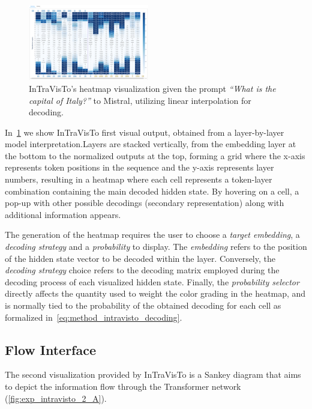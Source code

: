 \documentclass[11pt,a4paper,twocolumn]{article}
\begin{document}
\begin{figure}[h!]
    \centering
    \includegraphics[width=0.47\textwidth]{exp_intravisto_1A_heatmap.png}
    \caption{InTraVisTo's heatmap visualization given the prompt \emph{``What is the capital of Italy?''} to Mistral, utilizing linear interpolation for decoding.}
    \label{fig:exp_intravisto_1_A}
\end{figure}

In~\cref{fig:exp_intravisto_1_A} we show InTraVisTo first visual output, obtained from a layer-by-layer model interpretation.Layers are stacked vertically, from the embedding layer at the bottom to the normalized outputs at the top, forming a grid where the x-axis represents token positions in the sequence and the y-axis represents layer numbers, resulting in a heatmap where each cell represents a token-layer combination containing the main decoded hidden state.
By hovering on a cell, a pop-up with other possible decodings (secondary representation) along with additional information appears.

The generation of the heatmap requires the user to choose a \emph{target embedding}, a \emph{decoding strategy} and a \emph{probability} to display.
The \emph{embedding} refers to the position of the hidden state vector to be decoded within the layer.
Conversely, the \emph{decoding strategy} choice refers to the decoding matrix employed during the decoding process of each visualized hidden state.
Finally, the \emph{probability selector} directly affects the quantity used to weight the color grading in the heatmap, and is normally tied to the probability of the obtained decoding for each cell as formalized in~\cref{eq:method_intravisto_decoding}.

\subsection{Flow Interface}

The second visualization provided by InTraVisTo is a Sankey diagram that aims to depict the information flow through the Transformer network (\cref{fig:exp_intravisto_2_A}).
\end{document}

